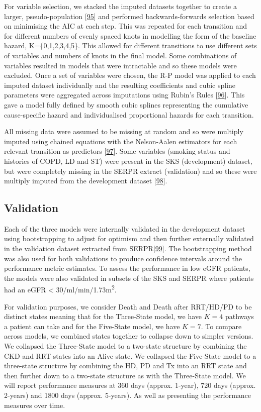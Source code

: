 \documentclass[12pt,PhD,twoside,openright]{muthesis}
\begin{document}
For variable selection, we stacked the imputed datasets together to create a larger, pseudo-population {[}\protect\hyperlink{ref-wood_how_2008}{95}{]} and performed backwards-forwards selection based on minimising the AIC at each step. This was repeated for each transition and for different numbers of evenly spaced knots in modelling the form of the baseline hazard, K=\{0,1,2,3,4,5\}. This allowed for different transitions to use different sets of variables and numbers of knots in the final model. Some combinations of variables resulted in models that were intractable and so these models were excluded. Once a set of variables were chosen, the R-P model was applied to each imputed dataset individually and the resulting coefficients and cubic spline parameters were aggregated across imputations using Rubin's Rules {[}\protect\hyperlink{ref-rubin_multiple_1984}{96}{]}. This gave a model fully defined by smooth cubic splines representing the cumulative cause-specific hazard and individualised proportional hazards for each transition.

All missing data were assumed to be missing at random and so were multiply imputed using chained equations with the Nelson-Aalen estimators for each relevant transition as predictors {[}\protect\hyperlink{ref-white_imputing_2009}{97}{]}. Some variables (smoking status and histories of COPD, LD and ST) were present in the SKS (development) dataset, but were completely missing in the SERPR extract (validation) and so these were multiply imputed from the development dataset {[}\protect\hyperlink{ref-janssen_dealing_2009}{98}{]}.

\hypertarget{validation}{%
\subsection{Validation}\label{validation}}

Each of the three models were internally validated in the development dataset using bootstrapping to adjust for optimism and then further externally validated in the validation dataset extracted from SERPR{[}\protect\hyperlink{ref-schomaker_bootstrap_2018}{99}{]}. The bootstrapping method was also used for both validations to produce confidence intervals around the performance metric estimates. To assess the performance in low eGFR patients, the models were also validated in subsets of the SKS and SERPR where patients had an eGFR \textless{} 30/ml/min/1.73m\textsuperscript{2}.

For validation purposes, we consider Death and Death after RRT/HD/PD to be distinct states meaning that for the Three-State model, we have \(K=4\) pathways a patient can take and for the Five-State model, we have \(K=7\). To compare across models, we combined states together to collapse down to simpler versions. We collapsed the Three-State model to a two-state structure by combining the CKD and RRT states into an Alive state. We collapsed the Five-State model to a three-state structure by combining the HD, PD and Tx into an RRT state and then further down to a two-state structure as with the Three-State model. We will report performance measures at 360 days (approx. 1-year), 720 days (approx. 2-years) and 1800 days (approx. 5-years). As well as presenting the performance measures over time.
\end{document}
